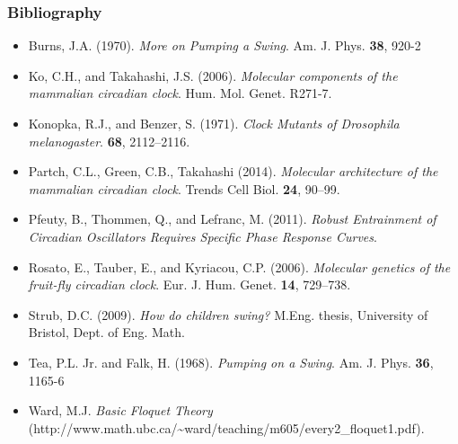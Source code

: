 \documentclass[swedish, english]{beamer}
\begin{document}
\begin{frame}
\frametitle{Bibliography}

\begin{flushleft}
\footnotesize
\begin{itemize}
\item
Burns, J.A. (1970). \textit{More on Pumping a Swing}. Am. J. Phys. \textbf{38}, 920-2

\vspace{-4pt}\item
Ko, C.H., and Takahashi, J.S. (2006). \textit{Molecular components of the
mammalian circadian clock}. Hum. Mol. Genet. R271-7.

\vspace{-4pt}\item
Konopka, R.J., and Benzer, S. (1971). \textit{Clock Mutants of Drosophila
melanogaster}. \textbf{68}, 2112–2116.

\vspace{-4pt}\item
Partch, C.L., Green, C.B., Takahashi (2014).
\textit{Molecular architecture of the mammalian circadian clock}. Trends Cell
Biol. \textbf{24}, 90–99.

\vspace{-4pt}\item
Pfeuty, B., Thommen, Q., and Lefranc, M. (2011). \textit{Robust Entrainment of
Circadian Oscillators Requires Specific Phase Response Curves}.

\vspace{-4pt}\item
Rosato, E., Tauber, E., and Kyriacou, C.P. (2006). \textit{Molecular genetics
of the fruit-fly circadian clock}. Eur. J. Hum. Genet. \textbf{14},
729–738.

\vspace{-4pt}\item
Strub, D.C. (2009). \textit{How do children swing?}  M.Eng. thesis, University
of Bristol, Dept. of Eng. Math.%

\vspace{-4pt}\item
Tea, P.L. Jr. and Falk, H. (1968). \textit{Pumping on a Swing}. Am. J. Phys. 
\textbf{36}, 1165-6

\vspace{-4pt}\item
Ward, M.J. \textit{Basic Floquet Theory}
(http://www.math.ubc.ca/\~{}ward/teaching/m605/every2\_floquet1.pdf).
\end{itemize}
\end{flushleft}
\end{frame}
\end{document}

